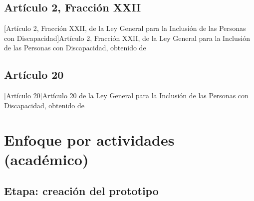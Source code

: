 \section{Artículo 2, Fracción XXII}
\begin{center}
    [Artículo 2, Fracción XXII, de la Ley General para la Inclusión de las Personas con Discapacidad]{Artículo 2, Fracción XXII, de la Ley General para la Inclusión de las Personas con Discapacidad, obtenido de \cite{ref34}}
\end{center}

\section{Artículo 20}
\begin{center}
    [Artículo 20]{Artículo 20 de la Ley General para la Inclusión de las Personas con Discapacidad, obtenido de \cite{ref34}}
\end{center}

\chapter[Anexo B. Enfoque por actividades (académico)]{Enfoque por actividades (académico)}
\label{anexo:actividades_academicas}  %
\section{Etapa: creación del prototipo}

